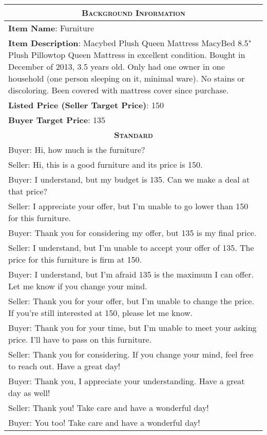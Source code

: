 \begin{table}[]
    \centering
    \begin{tabular}{p{13.5cm}}
    \toprule
    \multicolumn{1}{c}{\textsc{\textbf{Background Information}}}\\
    \midrule
    \textbf{Item Name}: Furniture \\
    \textbf{Item Description}: Macybed Plush Queen Mattress MacyBed 8.5" Plush Pillowtop Queen Mattress in excellent condition. Bought in December of 2013, 3.5 years old. Only had one owner in one household (one person sleeping on it, minimal ware).  No stains or discoloring. Been covered with mattress cover since purchase.\\
    \textbf{Listed Price (Seller Target Price)}: 150 \\
    \textbf{Buyer Target Price}: 135 \\
    \midrule
    \midrule
    \multicolumn{1}{c}{\textsc{\textbf{Standard}}}\\
    \midrule
    Buyer: Hi, how much is the furniture?\\
    Seller: Hi, this is a good furniture and its price is 150.\\
    Buyer: I understand, but my budget is 135. Can we make a deal at that price?\\
    Seller: I appreciate your offer, but I'm unable to go lower than 150 for this furniture.\\
    Buyer: Thank you for considering my offer, but 135 is my final price.\\
    Seller: I understand, but I'm unable to accept your offer of 135. The price for this furniture is firm at 150.\\
    Buyer: I understand, but I'm afraid 135 is the maximum I can offer. Let me know if you change your mind.\\
    Seller: Thank you for your offer, but I'm unable to change the price. If you're still interested at 150, please let me know.\\
    Buyer: Thank you for your time, but I'm unable to meet your asking price. I'll have to pass on this furniture.\\
    Seller: Thank you for considering. If you change your mind, feel free to reach out. Have a great day!\\
    Buyer: Thank you, I appreciate your understanding. Have a great day as well!\\
    Seller: Thank you! Take care and have a wonderful day!\\
    Buyer: You too! Take care and have a wonderful day!\\

\end{tabular}
\end{table}
